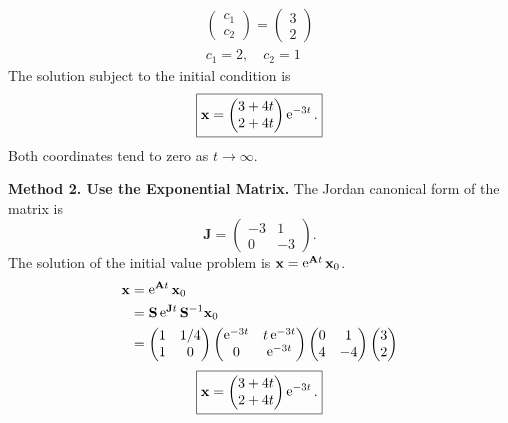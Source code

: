 {\begin{Solution}
\begin{gather*}
    \begin{pmatrix}
      c_1 \\
      c_2
    \end{pmatrix}
    =
    \begin{pmatrix}
      3 \\
      2
    \end{pmatrix} \\
    c_1 = 2, \quad c_2 = 1
  \end{gather*}
  The solution subject to the initial condition is
  \[
  \boxed{
    \mathbf{x} = 
    \begin{pmatrix} 3 + 4 t \\
      2 + 4 t \end{pmatrix} \mathop{\mathrm{e}}\nolimits^{-3 t}.
    }
  \]
  Both coordinates tend to zero as $t \to \infty$.


  \textbf{Method 2.  Use the Exponential Matrix.}
  The Jordan canonical form of the matrix is
  \[
  \mathbf{J} =
  \begin{pmatrix}
    -3 & 1 \\
    0 & -3
  \end{pmatrix}.
  \]
  The solution of the initial value problem is $\mathbf{x} = \mathop{\mathrm{e}}\nolimits^{\mathbf{A} t} \mathbf{x}_0$.
  \begin{align*}
    \mathbf{x} &= \mathop{\mathrm{e}}\nolimits^{\mathbf{A} t} \mathbf{x}_0 \\
    &= \mathbf{S} \mathop{\mathrm{e}}\nolimits^{\mathbf{J} t} \mathbf{S}^{-1} \mathbf{x}_0 \\
    &= \begin{pmatrix} 1 & 1/4 \\ 1 & 0 \end{pmatrix}
    \begin{pmatrix} \mathop{\mathrm{e}}\nolimits^{-3 t} & t \mathop{\mathrm{e}}\nolimits^{-3 t} \\ 0 & \mathop{\mathrm{e}}\nolimits^{-3 t} \end{pmatrix}
    \begin{pmatrix} 0 & 1 \\ 4 & -4 \end{pmatrix}
    \begin{pmatrix} 3 \\ 2 \end{pmatrix}
  \end{align*}
  \[
  \boxed{
    \mathbf{x} = 
    \begin{pmatrix} 3 + 4 t \\
      2 + 4 t \end{pmatrix} \mathop{\mathrm{e}}\nolimits^{-3 t}.
    }
  \]
\end{Solution}











}
